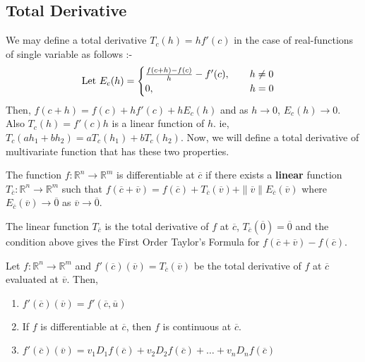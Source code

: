 \subsection{Total Derivative}
	We may define a total derivative \( T_c(h) = hf'(c) \) in the case of real-functions of single variable as follows :-\\

	\[ \text{Let }E_c(h) = \begin{cases} \frac{f(c+h)-f(c)}{h} - f'(c),\qquad h \ne 0 \\ 0,\hspace{3.4cm} h = 0 \end{cases} \]
		Then, \( f(c+h) = f(c) + hf'(c) + hE_c(h) \) and as \( h \to 0 \), \( E_c(h) \to 0\). Also \( T_c(h) = f'(c)h \) is a linear function of $h$. ie, \( T_c(ah_1+bh_2) = aT_c(h_1)+bT_c(h_2) \). Now, we will define a total derivative of multivariate function that has these two properties.

\begin{definition}
	The function \( f: \mathbb{R}^n \to \mathbb{R}^m \) is differentiable at $\overline{c}$ if there exists a \textbf{linear} function \( T_{\overline{c}} : \mathbb{R}^n \to \mathbb{R}^m \) such that \( f(\overline{c}+\overline{v}) = f(\overline{c}) + T_{\overline{c}}(\overline{v}) + \|\overline{v}\| E_{\overline{c}}(\overline{v}) \) where \( E_{\overline{c}}(\overline{v}) \to \overline{0} \) as \( \overline{v} \to \overline{0} \).
\end{definition}

	The linear function $T_{\overline{c}}$ is the total derivative of $f$ at $\overline{c}$, \( T_{\overline{c}}(\overline{0}) = \overline{0} \) and the condition above gives the First Order Taylor's Formula for \( f(\overline{c}+\overline{v})-f(\overline{c}) \).

\begin{remark}[Properties] Let \( f : \mathbb{R}^n \to \mathbb{R}^m \) and \( f'(\overline{c})(\overline{v}) = T_{\overline{c}}(\overline{v}) \) be the total derivative of $f$ at $\overline{c}$ evaluated at $\overline{v}$. Then, 
	\begin{enumerate}
		\item \( f'(\overline{c})(\overline{v}) = f'(\overline{c},\overline{u}) \)
		\item If $f$ is differentiable at $\overline{c}$, then $f$ is continuous at $\overline{c}$.
		\item \( f'(\overline{c})(\overline{v}) = v_1 D_1 f(\overline{c}) + v_2 D_2 f(\overline{c}) + \dots + v_n D_n f(\overline{c}) \)
	\end{enumerate}
\end{remark}

